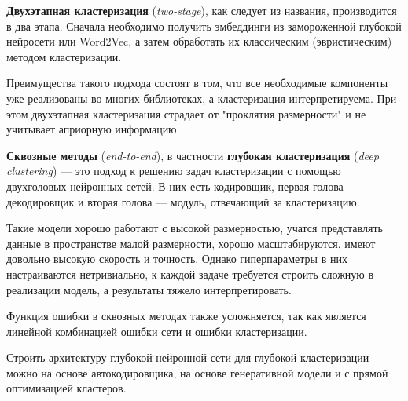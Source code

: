 \begin{definition}
    \textbf{Двухэтапная кластеризация} (\textit{two-stage}), как следует из названия, производится в два этапа. Сначала необходимо получить эмбеддинги из замороженной глубокой нейросети или Word2Vec, а затем обработать их классическим (эвристическим) методом кластеризации.
\end{definition}

Преимущества такого подхода состоят в том, что все необходимые компоненты уже реализованы во многих библиотеках, а кластеризация интерпретируема. При этом двухэтапная кластеризация страдает от "проклятия размерности" и не учитывает априорную информацию.

\begin{definition}
    \textbf{Сквозные методы} (\textit{end-to-end}), в частности \textbf{глубокая кластеризация} (\textit{deep clustering}) --- это подход к решению задач кластеризации с помощью двухголовых нейронных сетей. В них есть кодировщик, первая голова -- декодировщик и вторая голова --- модуль, отвечающий за кластеризацию.
\end{definition}

Такие модели хорошо работают с высокой размерностью, учатся представлять данные в пространстве малой размерности, хорошо масштабируются, имеют довольно высокую скорость и точность. Однако гиперпараметры в них настраиваются нетривиально, к каждой задаче требуется строить сложную в реализации модель, а результаты тяжело интерпретировать.

\begin{remark}
    Функция ошибки в сквозных методах также усложняется, так как является линейной комбинацией ошибки сети и ошибки кластеризации.
\end{remark}

\begin{remark}
    Строить архитектуру глубокой нейронной сети для глубокой кластеризации можно на основе автокодировщика, на основе генеративной модели и с прямой оптимизацией кластеров.
\end{remark}
